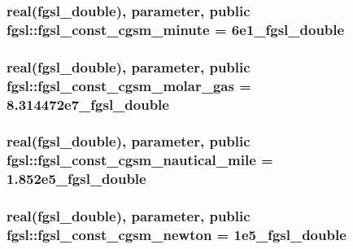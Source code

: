 \hypertarget{classfgsl_ab028fa17e53d65adbb35fa580f5e25a0}{
\subsubsection[{fgsl\-\_\-const\-\_\-cgsm\-\_\-minute}]{\setlength{\rightskip}{0pt plus 5cm}real({\bf fgsl\-\_\-double}), parameter, public fgsl\-::fgsl\-\_\-const\-\_\-cgsm\-\_\-minute = 6e1\-\_\-fgsl\-\_\-double}}\label{classfgsl_ab028fa17e53d65adbb35fa580f5e25a0}
\hypertarget{classfgsl_a23addc2e9852914913cdbe8e164b27ae}{
\subsubsection[{fgsl\-\_\-const\-\_\-cgsm\-\_\-molar\-\_\-gas}]{\setlength{\rightskip}{0pt plus 5cm}real({\bf fgsl\-\_\-double}), parameter, public fgsl\-::fgsl\-\_\-const\-\_\-cgsm\-\_\-molar\-\_\-gas = 8.\-314472e7\-\_\-fgsl\-\_\-double}}\label{classfgsl_a23addc2e9852914913cdbe8e164b27ae}
\hypertarget{classfgsl_ad2fef81cdb19dcaed2ce527744cb8600}{
\subsubsection[{fgsl\-\_\-const\-\_\-cgsm\-\_\-nautical\-\_\-mile}]{\setlength{\rightskip}{0pt plus 5cm}real({\bf fgsl\-\_\-double}), parameter, public fgsl\-::fgsl\-\_\-const\-\_\-cgsm\-\_\-nautical\-\_\-mile = 1.\-852e5\-\_\-fgsl\-\_\-double}}\label{classfgsl_ad2fef81cdb19dcaed2ce527744cb8600}
\hypertarget{classfgsl_a1130bb96c29d828c350ca8882cac2a6d}{
\subsubsection[{fgsl\-\_\-const\-\_\-cgsm\-\_\-newton}]{\setlength{\rightskip}{0pt plus 5cm}real({\bf fgsl\-\_\-double}), parameter, public fgsl\-::fgsl\-\_\-const\-\_\-cgsm\-\_\-newton = 1e5\-\_\-fgsl\-\_\-double}}\label{classfgsl_a1130bb96c29d828c350ca8882cac2a6d}

